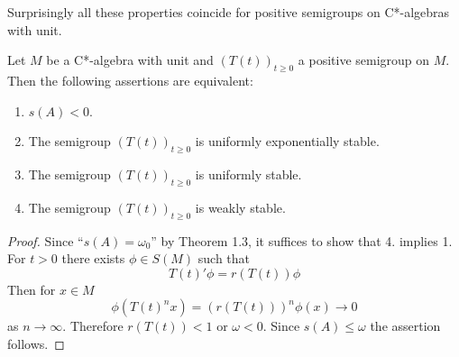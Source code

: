 Surprisingly all these properties coincide for positive semigroups on C*-algebras with unit.

\begin{theorem}\label{thm:1.7}
Let $M$ be a C*-algebra with unit and $(T(t))_{t\geq 0}$ a positive semigroup on $M$.
Then the following assertions are equivalent:
\begin{enumerate}[(1)]
\item
$s(A) < 0$.

\item
The semigroup $(T(t))_{t\geq 0}$ is uniformly exponentially stable.

\item
The semigroup $(T(t))_{t\geq 0}$ is uniformly stable.

\item
The semigroup $(T(t))_{t\geq 0}$ is weakly stable.
\end{enumerate}
\end{theorem}

\begin{proof}
Since \enquote{$ s(A) = \omega_{0}$} by Theorem 1.3, it suffices to show that 4. implies 1.
For $t > 0$ there exists $\phi \in S(M)$ such that
\[
T(t)'\phi = r(T(t))\phi
\]
Then for $x \in M$
\[
\phi(T(t)^n x) = (r(T(t)))^n \phi(x) \to 0
\]
as $n \to \infty$.
Therefore $r(T(t)) < 1$ or $\omega < 0$.
Since $s(A) \leq \omega$ the assertion follows.
\end{proof}